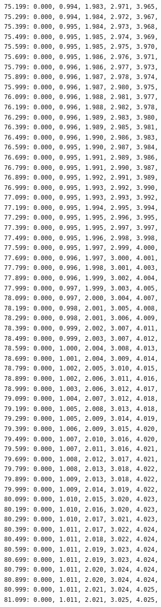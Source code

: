 \documentclass[12pt, a4paper]{article}
\begin{document}
\begin{scriptsize}
\begin{ttfamily}
\begin{lstlisting}
75.199: 0.000, 0.994, 1.983, 2.971, 3.965, 
75.299: 0.000, 0.994, 1.984, 2.972, 3.967, 
75.399: 0.000, 0.995, 1.984, 2.973, 3.968, 
75.499: 0.000, 0.995, 1.985, 2.974, 3.969, 
75.599: 0.000, 0.995, 1.985, 2.975, 3.970, 
75.699: 0.000, 0.995, 1.986, 2.976, 3.971, 
75.799: 0.000, 0.996, 1.986, 2.977, 3.973, 
75.899: 0.000, 0.996, 1.987, 2.978, 3.974, 
75.999: 0.000, 0.996, 1.987, 2.980, 3.975, 
76.099: 0.000, 0.996, 1.988, 2.981, 3.977, 
76.199: 0.000, 0.996, 1.988, 2.982, 3.978, 
76.299: 0.000, 0.996, 1.989, 2.983, 3.980, 
76.399: 0.000, 0.996, 1.989, 2.985, 3.981, 
76.499: 0.000, 0.996, 1.990, 2.986, 3.983, 
76.599: 0.000, 0.995, 1.990, 2.987, 3.984, 
76.699: 0.000, 0.995, 1.991, 2.989, 3.986, 
76.799: 0.000, 0.995, 1.991, 2.990, 3.987, 
76.899: 0.000, 0.995, 1.992, 2.991, 3.989, 
76.999: 0.000, 0.995, 1.993, 2.992, 3.990, 
77.099: 0.000, 0.995, 1.993, 2.993, 3.992, 
77.199: 0.000, 0.995, 1.994, 2.995, 3.994, 
77.299: 0.000, 0.995, 1.995, 2.996, 3.995, 
77.399: 0.000, 0.995, 1.995, 2.997, 3.997, 
77.499: 0.000, 0.995, 1.996, 2.998, 3.998, 
77.599: 0.000, 0.995, 1.997, 2.999, 4.000, 
77.699: 0.000, 0.996, 1.997, 3.000, 4.001, 
77.799: 0.000, 0.996, 1.998, 3.001, 4.003, 
77.899: 0.000, 0.996, 1.999, 3.002, 4.004, 
77.999: 0.000, 0.997, 1.999, 3.003, 4.005, 
78.099: 0.000, 0.997, 2.000, 3.004, 4.007, 
78.199: 0.000, 0.998, 2.001, 3.005, 4.008, 
78.299: 0.000, 0.998, 2.001, 3.006, 4.009, 
78.399: 0.000, 0.999, 2.002, 3.007, 4.011, 
78.499: 0.000, 0.999, 2.003, 3.007, 4.012, 
78.599: 0.000, 1.000, 2.004, 3.008, 4.013, 
78.699: 0.000, 1.001, 2.004, 3.009, 4.014, 
78.799: 0.000, 1.002, 2.005, 3.010, 4.015, 
78.899: 0.000, 1.002, 2.006, 3.011, 4.016, 
78.999: 0.000, 1.003, 2.006, 3.012, 4.017, 
79.099: 0.000, 1.004, 2.007, 3.012, 4.018, 
79.199: 0.000, 1.005, 2.008, 3.013, 4.018, 
79.299: 0.000, 1.005, 2.009, 3.014, 4.019, 
79.399: 0.000, 1.006, 2.009, 3.015, 4.020, 
79.499: 0.000, 1.007, 2.010, 3.016, 4.020, 
79.599: 0.000, 1.007, 2.011, 3.016, 4.021, 
79.699: 0.000, 1.008, 2.012, 3.017, 4.021, 
79.799: 0.000, 1.008, 2.013, 3.018, 4.022, 
79.899: 0.000, 1.009, 2.013, 3.018, 4.022, 
79.999: 0.000, 1.009, 2.014, 3.019, 4.022, 
80.099: 0.000, 1.010, 2.015, 3.020, 4.023, 
80.199: 0.000, 1.010, 2.016, 3.020, 4.023, 
80.299: 0.000, 1.010, 2.017, 3.021, 4.023, 
80.399: 0.000, 1.011, 2.017, 3.022, 4.024, 
80.499: 0.000, 1.011, 2.018, 3.022, 4.024, 
80.599: 0.000, 1.011, 2.019, 3.023, 4.024, 
80.699: 0.000, 1.011, 2.019, 3.023, 4.024, 
80.799: 0.000, 1.011, 2.020, 3.024, 4.024, 
80.899: 0.000, 1.011, 2.020, 3.024, 4.024, 
80.999: 0.000, 1.011, 2.021, 3.024, 4.025, 
81.099: 0.000, 1.011, 2.021, 3.025, 4.025, 

\end{lstlisting}
\end{ttfamily}
\end{scriptsize}
\end{document}
